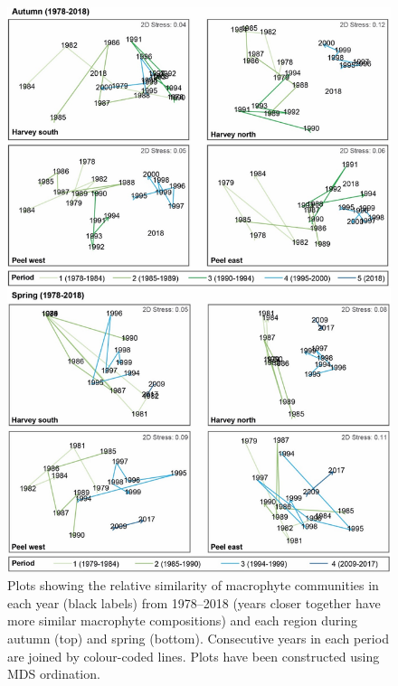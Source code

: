 \documentclass[
]{book}
\begin{document}
\begin{figure}
\includegraphics[width=1\linewidth]{images/macrophytes/picture10} \caption{Plots showing the relative similarity of macrophyte communities in each year (black labels) from 1978–2018 (years closer together have more similar macrophyte compositions) and each region during autumn (top) and spring (bottom). Consecutive years in each period are joined by colour-coded lines. Plots have been constructed using MDS ordination.}\label{fig:macrophytes-pic10}
\end{figure}
\end{document}
